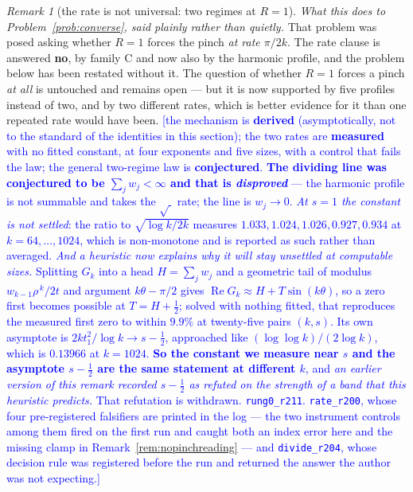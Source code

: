 \documentclass[11pt,a4paper]{article}
\theoremstyle{plain}
\theoremstyle{definition}
\theoremstyle{remark}
\newtheorem{remark}[theorem]{Remark}
\newcommand{\STATUS}[1]{\textcolor{blue}{\textsf{[#1]}}}
\begin{document}
\begin{remark}[the rate is not universal: two regimes at $R=1$]
\emph{What this does to Problem~\ref{prob:converse}, said plainly rather than quietly.} That
problem was posed asking whether $R=1$ forces the pinch \emph{at rate $\pi/2k$}. The rate clause
is answered \textbf{no}, by family C and now also by the harmonic profile, and the problem below
has been restated without it. The
question of whether $R=1$ forces a pinch \emph{at all} is untouched and remains open --- but it
is now supported by five profiles instead of two, and by two different rates, which is better
evidence for it than one repeated rate would have been.
\STATUS{the mechanism is \textbf{derived} (asymptotically, not to the standard of the identities
in this section); the two rates are \textbf{measured} with no fitted constant, at four exponents
and five sizes, with a control that fails the law; the general two-regime law is
\textbf{conjectured}. \textbf{The dividing line was conjectured to be $\sum_j w_j<\infty$ and that
is \emph{disproved}} --- the harmonic profile is not summable and takes the $\sqrt{\ }$ rate; the
line is $w_j\to0$. \emph{At $s=1$ the constant is not settled}: the ratio to
$\sqrt{\log k/2k}$ measures $1.033, 1.024, 1.026, 0.927, 0.934$ at $k=64,\dots,1024$, which is
non-monotone and is reported as such rather than averaged.
\emph{And a heuristic now explains why it will stay unsettled at computable sizes.} Splitting
$G_k$ into a head $H=\sum_jw_j$ and a geometric tail of modulus $w_{k-1}\rho^{\,k}/2t$ and
argument $k\theta-\pi/2$ gives $\operatorname{Re}G_k\approx H+T\sin(k\theta)$, so a zero first
becomes possible at $T=H+\tfrac12$; solved with nothing fitted, that reproduces the measured
first zero to within $9.9\%$ at twenty-five pairs $(k,s)$. Its own asymptote is
$2kt_1^{2}/\log k\to s-\tfrac12$, approached like $(\log\log k)/(2\log k)$, which is $0.13966$
at $k=1024$. \textbf{So the constant we measure near $s$ and the asymptote $s-\tfrac12$ are the
same statement at different $k$}, and \emph{an earlier version of this remark recorded
$s-\tfrac12$ as refuted on the strength of a band that this heuristic predicts.} That
refutation is withdrawn. \texttt{rung0\_r211}.
\texttt{rate\_r200}, whose four pre-registered falsifiers are printed in the log ---
the two instrument controls among them fired on the first run and caught both an index error here
and the missing clamp in Remark~\ref{rem:nopinchreading} --- and \texttt{divide\_r204}, whose
decision rule was registered before the run and returned the answer the author was not expecting.}
\end{remark}
\end{document}
